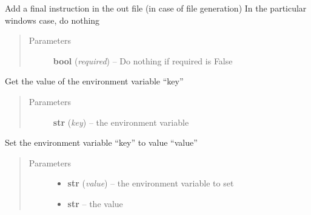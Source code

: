 \documentclass[a4paper,10pt,english]{sphinxmanual}
\begin{document}
\begin{fulllineitems}

\begin{fulllineitems}
\label{commands/apidoc/src:src.fileEnviron.BatFileEnviron.finish}
Add a final instruction in the out file (in case of file generation)
In the particular windows case, do nothing
\begin{quote}\begin{description}
\item[{Parameters}] \leavevmode
\textbf{bool} (\emph{required}) -- Do nothing if required is False

\end{description}\end{quote}

\end{fulllineitems}


\begin{fulllineitems}
\label{commands/apidoc/src:src.fileEnviron.BatFileEnviron.get}
Get the value of the environment variable ``key''
\begin{quote}\begin{description}
\item[{Parameters}] \leavevmode
\textbf{str} (\emph{key}) -- the environment variable

\end{description}\end{quote}

\end{fulllineitems}


\begin{fulllineitems}
\label{commands/apidoc/src:src.fileEnviron.BatFileEnviron.set}
Set the environment variable ``key'' to value ``value''
\begin{quote}\begin{description}
\item[{Parameters}] \leavevmode\begin{itemize}
\item {} 
\textbf{str} (\emph{value}) -- the environment variable to set

\item {} 
\textbf{str} -- the value

\end{itemize}

\end{description}\end{quote}

\end{fulllineitems}


\end{fulllineitems}
\end{document}
